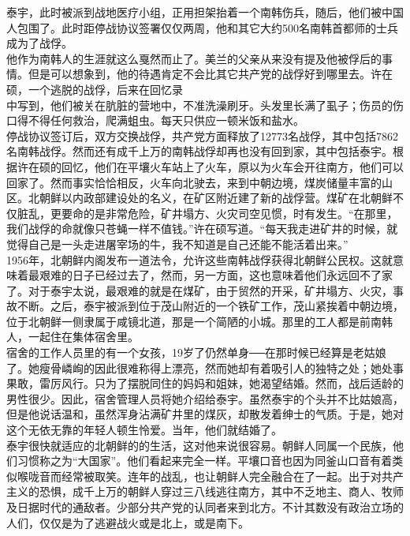 泰宇，此时被派到战地医疗小组，正用担架抬着一个南韩伤兵，随后，他们被中国人包围了。此时距停战协议签署仅仅两周，他和其它大约500名南韩首都师的士兵成为了战俘。\\

他作为南韩人的生涯就这么戛然而止了。美兰的父亲从来没有提及他被俘后的事情。但是可以想象到，他的待遇肯定不会比其它共产党的战俘好到哪里去。许在硕，一个逃脱的战俘，后来在回忆录\\

中写到，他们被关在肮脏的营地中，不准洗澡刷牙。头发里长满了虱子；伤员的伤口得不得任何救治，爬满蛆虫。每天只供应一顿米饭和盐水。\\

停战协议签订后，双方交换战俘，共产党方面释放了12773名战俘，其中包括7862名南韩战俘。然而还有成千上万的南韩战俘却再也没有回到家，其中包括泰宇。根据许在硕的回忆，他们在平壤火车站上了火车，原以为火车会开往南方，他们可以回家了。然而事实恰恰相反，火车向北驶去，来到中朝边境，煤炭储量丰富的山区。北朝鲜以内政部建设处的名义，在矿区附近建了新的战俘营。煤矿在北朝鲜不仅脏乱，更要命的是非常危险，矿井塌方、火灾司空见惯，时有发生。“在那里，我们战俘的命就像只苍蝇一样不值钱。”许在硕写道。“每天我走进矿井的时候，就觉得自己是一头走进屠宰场的牛，我不知道是自己还能不能活着出来。”\\

1956年，北朝鲜内阁发布一道法令，允许这些南韩战俘获得北朝鲜公民权。这就意味着最艰难的日子已经过去了，然而，另一方面，这也意味着他们永远回不了家了。对于泰宇太说，最艰难的就是在煤矿，由于贸然的开采，矿井塌方、火灾，事故不断。之后，泰宇被派到位于茂山附近的一个铁矿工作，茂山紧挨着中朝边境，位于北朝鲜一侧隶属于咸镜北道，那是一个简陋的小城。那里的工人都是前南韩人，一起住在集体宿舍里。\\

宿舍的工作人员里的有一个女孩，19岁了仍然单身──在那时候已经算是老姑娘了。她瘦骨嶙峋的因此很难称得上漂亮，然而她却有着吸引人的独特之处；她处事果敢，雷厉风行。只为了摆脱同住的妈妈和姐妹，她渴望结婚。然而，战后适龄的男性很少。因此，宿舍管理人员将她介绍给泰宇。虽然泰宇的个头并不比姑娘高，但是他说话温和，虽然浑身沾满矿井里的煤灰，却散发着绅士的气质。于是，她对这个无依无靠的年轻人顿生怜爱。当年，他们就结婚了。\\

泰宇很快就适应的北朝鲜的的生活，这对他来说很容易。朝鲜人同属一个民族，他们习惯称之为“大国家”。他们看起来完全一样。平壤口音也因为同釜山口音有着类似喉咙音而经常被取笑。连年的战乱，也让朝鲜人完全融合在了一起。出于对共产主义的恐惧，成千上万的朝鲜人穿过三八线逃往南方，其中不乏地主、商人、牧师及日据时代的通敌者。少部分共产党的认同者来到北方。不计其数没有政治立场的人们，仅仅是为了逃避战火或是北上，或是南下。\\

